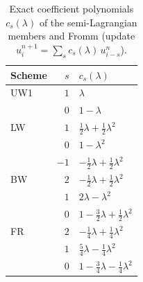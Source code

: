 \documentclass[pdflatex,sn-mathphys-num]{sn-jnl}%
\theoremstyle{thmstyleone}%
\theoremstyle{thmstyletwo}%
\theoremstyle{thmstylethree}%
\begin{document}
\begin{appendices}
\begin{table}[htbp]
\centering
\caption{Exact coefficient polynomials $c_s(\lambda)$ of the semi-Lagrangian members and Fromm (update $u_i^{n+1}=\sum_s c_s(\lambda)\,u_{i-s}^n$).}
\label{tab:coeff-sl}
\begin{tabular}{@{}lrl@{}}
\toprule
Scheme & $s$  & $c_s(\lambda)$                                                                                                                      \\
\midrule
UW1    & $1$  & $\lambda$                                                                                                                           \\
       & $0$  & $1 - \lambda$                                                                                                                       \\
\midrule
LW     & $1$  & $\tfrac{1}{2}\lambda + \tfrac{1}{2}\lambda^{2}$                                                                                     \\
       & $0$  & $1 - \lambda^{2}$                                                                                                                   \\
       & $-1$ & $-\tfrac{1}{2}\lambda + \tfrac{1}{2}\lambda^{2}$                                                                                    \\
\midrule
BW     & $2$  & $-\tfrac{1}{2}\lambda + \tfrac{1}{2}\lambda^{2}$                                                                                    \\
       & $1$  & $2\lambda - \lambda^{2}$                                                                                                            \\
       & $0$  & $1 - \tfrac{3}{2}\lambda + \tfrac{1}{2}\lambda^{2}$                                                                                 \\
\midrule
FR     & $2$  & $-\tfrac{1}{4}\lambda + \tfrac{1}{4}\lambda^{2}$                                                                                    \\
       & $1$  & $\tfrac{5}{4}\lambda - \tfrac{1}{4}\lambda^{2}$                                                                                     \\
       & $0$  & $1 - \tfrac{3}{4}\lambda - \tfrac{1}{4}\lambda^{2}$                                                                                 \\

\end{tabular}
\end{table}
\end{appendices}
\end{document}

